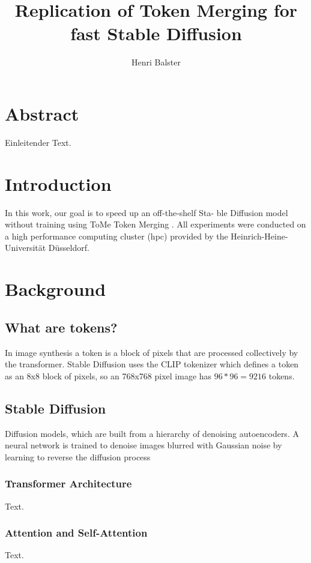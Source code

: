 \documentclass{article}
\title{{\myfont Replication of Token Merging for fast Stable Diffusion}}
\author{Henri Balster}
\date{}
\begin{document}
\maketitle

\tableofcontents

\newpage
\section*{Abstract}
Einleitender Text.





\newpage
\section{Introduction}
In this work, our goal is to speed up an off-the-shelf Sta-
ble Diffusion model without training using ToMe
Token Merging \cite{bolya2023tomesd}.
All experiments were conducted on a high performance computing cluster (hpc) provided by the Heinrich-Heine-Universität Düsseldorf.




\newpage
\section{Background}
\subsection{What are tokens?}
In image synthesis a token is a block of pixels that are processed collectively by the transformer. Stable Diffusion uses the CLIP tokenizer which defines a token as an 8x8 block of pixels, so an 768x768 pixel image has \(96*96=9216\) tokens.

\subsection{Stable Diffusion}
Diffusion models, which are built from a hierarchy of
denoising autoencoders. A neural network is trained to denoise images blurred with Gaussian noise by learning to reverse the diffusion process

\subsubsection{Transformer Architecture}
Text.

\subsubsection{Attention and Self-Attention}
Text.
\end{document}

